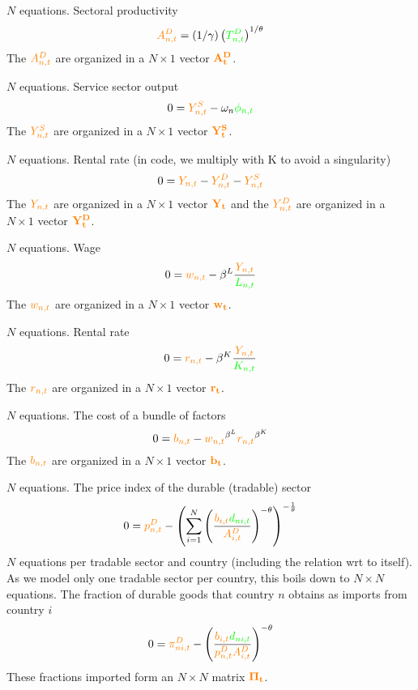 \documentclass[11pt]{article}
\newcommand{\cl}[1]{{\color{orange}{#1}}}
\newcommand{\st}[1]{{\color{green}{#1}}}
\begin{document}
\noindent $N$ equations. Sectoral productivity
\begin{equation}
\cl{A_{n, t}^{D}}=(1 / \gamma)\left(\st{T_{n, t}^{D}}\right)^{1 / \theta}
\end{equation}
The $\cl{A^D_{n,t}}$ are organized in a $ N \times 1$ vector $\mathbf{\cl{A^D_t}}$.

\noindent $N$ equations. Service sector output
\begin{equation}
0 =\cl{Y^S_{n,t}} - \omega_n \st{\phi_{n,t}}
\end{equation}
The $\cl{Y^S_{n,t}}$ are organized in a $ N \times 1$ vector $\mathbf{\cl{Y^S_t}}$.

\noindent $N$ equations. Rental rate (in code, we multiply with K to avoid a singularity)
\begin{equation}
0 =\cl{Y_{n,t}} - \cl{Y^D_{n,t}} - \cl{Y^S_{n,t}}
\end{equation}
The $\cl{Y_{n,t}}$ are organized in a $ N \times 1$ vector $\mathbf{\cl{Y_t}}$ and the $\cl{Y^D_{n,t}}$ are organized in a $ N \times 1$ vector $\mathbf{\cl{Y^D_t}}$.

\noindent $N$ equations. Wage
\begin{equation}
0 =\cl{w_{n,t}} - \beta^L \frac{\cl{Y_{n,t}}}{\st{L_{n,t}}}
\end{equation}
The $\cl{w_{n,t}}$ are organized in a $ N \times 1$ vector $\mathbf{\cl{w_t}}$.


\noindent $N$ equations. Rental rate
\begin{equation}
  0 = \cl{r_{n,t}} - \beta^K \frac{\cl{Y_{n,t}}}{\st{K_{n,t}}}
\end{equation}
The $\cl{r_{n,t}}$ are organized in a $ N \times 1$ vector $\mathbf{\cl{r_t}}$.

\noindent $N$ equations. The cost of a bundle of factors
\begin{equation}
0 = \cl{b_{n,t}} - \cl{w_{n,t}}^{\beta^L}\cl{r_{n,t}}^{\beta^K}
\end{equation}
The $\cl{b_{n,t}}$ are organized in a $ N \times 1$ vector $\mathbf{\cl{b_t}}$.


\noindent $N$ equations. The price index of the durable (tradable) sector
\begin{equation}
0 = \cl{p^D_{n,t}} - \left(\sum^{N}_{i=1} \left( \frac{\cl{b_{i,t}} \st{d_{ni,t}}}{\cl{A_{i,t}^D}} \right)^{-\theta} \right)^{-\frac{1}{\theta}}
\end{equation}
$N$ equations per tradable sector and country (including the relation wrt to itself). As we model only one tradable sector per country, this boils down to $N \times N$ equations. The fraction of durable goods that country $n$ obtains as imports from country $i$
\begin{equation}
0 = \cl{\pi^D_{ni,t}} - \left( \frac{\cl{b_{i,t}} \st{d_{ni,t}}}{\cl{p_{n,t}^D} \cl{A_{i,t}^D}} \right)^{-\theta}
\end{equation}
These fractions imported form an $N \times N$ matrix $\mathbf{\cl{\Pi_t}}$.
\end{document}
